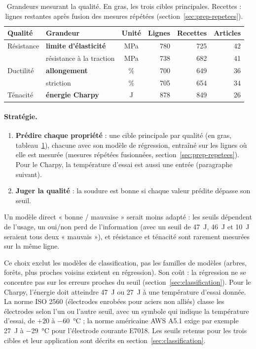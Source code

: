 \begin{table}[!htbp]
  \centering\small
  \begin{tabular}{@{}l l c r r r@{}}
    \toprule
    \textbf{Qualité} & \textbf{Grandeur} & \textbf{Unité} & \textbf{Lignes} & \textbf{Recettes} & \textbf{Articles} \\
    \midrule
    Résistance & \textbf{limite d'élasticité} & \si{\mega\pascal} & 780 & 725 & 42 \\
               & résistance à la traction     & \si{\mega\pascal} & 738 & 682 & 41 \\
    Ductilité  & \textbf{allongement}         & \%                & 700 & 649 & 36 \\
               & striction                    & \%                & 705 & 654 & 34 \\
    Ténacité   & \textbf{énergie Charpy}      & \si{\joule}       & 878 & 849 & 26 \\
    \bottomrule
  \end{tabular}
  \caption{Grandeurs mesurant la qualité. En gras, les trois cibles principales.
    Recettes : lignes restantes après fusion des mesures répétées
    (section~\ref{sec:prep-repetees}).}
  \label{tab:cibles}
\end{table}

\paragraph{Stratégie.}
\begin{enumerate}
  \item \textbf{Prédire chaque propriété} : une cible principale par qualité (en gras,
    tableau~\ref{tab:cibles}), chacune avec son modèle de régression, entraîné sur les
    lignes où elle est mesurée (mesures répétées fusionnées, section~\ref{sec:prep-repetees}). Pour le Charpy, la
    température d'essai est aussi une entrée (paragraphe suivant).
  \item \textbf{Juger la qualité} : la soudure est bonne si chaque valeur prédite dépasse
    son seuil.
\end{enumerate}
Un modèle direct « bonne / mauvaise » serait moins adapté : les seuils dépendent de
l'usage, un oui/non perd de l'information (avec un seuil de \SI{47}{\joule},
\SI{46}{\joule} et \SI{10}{\joule} seraient tous deux « mauvais »), et résistance et
ténacité sont rarement mesurées sur la même ligne.

Ce choix exclut les modèles de classification, pas les familles de modèles (arbres,
forêts, plus proches voisins existent en régression). Son coût : la régression ne se
concentre pas sur les erreurs proches du seuil (section~\ref{sec:classification}). Pour le
Charpy, l'énergie doit atteindre \SI{47}{\joule} ou \SI{27}{\joule} à une température
d'essai donnée. La norme ISO 2560 (électrodes enrobées pour aciers non alliés) classe les
électrodes selon l'un ou l'autre seuil, avec un symbole qui indique la température
d'essai, de $+20$ à \SI{-60}{\celsius} ; la norme américaine AWS A5.1 exige par exemple
\SI{27}{\joule} à \SI{-29}{\celsius} pour l'électrode courante E7018. Les seuils
retenus pour les trois cibles et leur application sont décrits en
section~\ref{sec:classification}.

